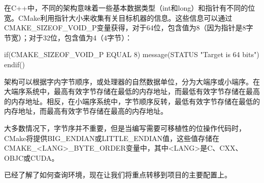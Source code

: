 在C++中，不同的架构意味着一些基本数据类型（int和long）和指针有不同的位宽。CMake利用指针大小来收集有关目标机器的信息。这些信息可以通过CMAKE\_SIZEOF\_VOID\_P变量获得，对于64位，包含值为8（因为指针是8字节宽）；对于32位，包含值为4（4字节）：

\begin{cmake}
if(CMAKE_SIZEOF_VOID_P EQUAL 8)
    message(STATUS "Target is 64 bits")
endif()
\end{cmake}


架构可以根据字内字节顺序，或处理器的自然数据单位，分为大端序或小端序。在大端序系统中，最高有效字节存储在最低的内存地址，而最低有效字节存储在最高的内存地址。相反，在小端序系统中，字节顺序反转，最低有效字节存储在最低的内存地址，而最高有效字节存储在最高的内存地址。

大多数情况下，字节序并不重要，但是当编写需要可移植性的位操作代码时，CMake将提供BIG\_ENDIAN或LITTLE\_ENDIAN值，这些值存储在CMAKE\_<LANG>\_BYTE\_ORDER变量中，其中<LANG>是C、CXX、OBJC或CUDA。

已经了解了如何查询环境，现在让我们将重点转移到项目的主要配置上。





















